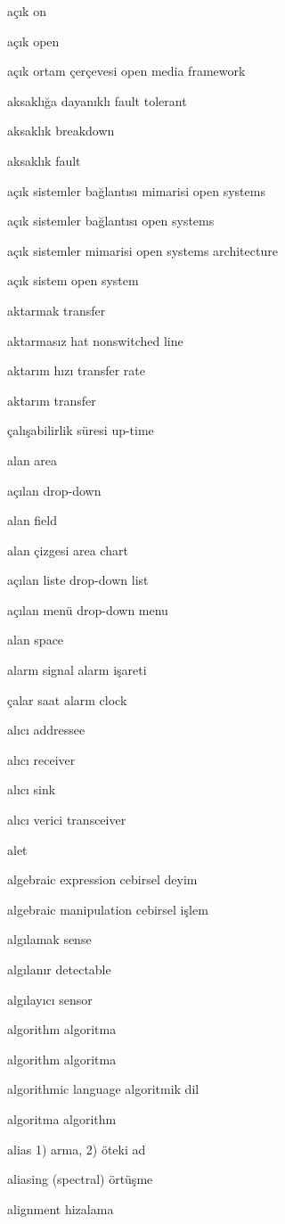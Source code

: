 \documentclass[12pt,fleqn]{article}\usepackage{../../common}
\begin{document}
açık on

açık open

açık ortam çerçevesi open media framework

aksaklığa dayanıklı fault tolerant

aksaklık breakdown

aksaklık fault

açık sistemler bağlantısı mimarisi open systems

açık sistemler bağlantısı open systems

açık sistemler mimarisi open systems architecture

açık sistem open system

aktarmak transfer

aktarmasız hat nonswitched line

aktarım hızı transfer rate

aktarım transfer

çalışabilirlik süresi up-time

alan area

açılan drop-down

alan field

alan çizgesi area chart

açılan liste drop-down list

açılan menü drop-down menu

alan space

alarm signal alarm işareti

çalar saat alarm clock

alıcı addressee

alıcı receiver

alıcı sink

alıcı verici transceiver

alet

algebraic expression cebirsel deyim

algebraic manipulation cebirsel işlem

algılamak sense

algılanır detectable

algılayıcı sensor

algorithm algoritma

algorithm algoritma

algorithmic language algoritmik dil

algoritma algorithm

alias 1) arma, 2) öteki ad

aliasing (spectral) örtüşme

alignment hizalama
\end{document}
